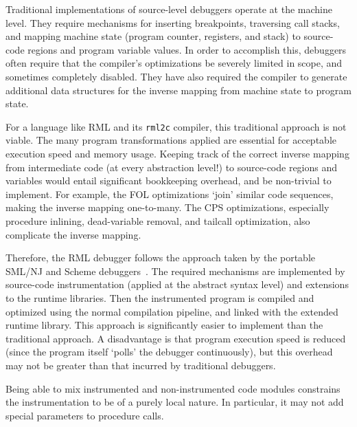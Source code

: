 \documentclass[12pt,a4paper]{article}
\begin{document}
Traditional implementations of source-level debuggers operate
at the machine level. They require mechanisms for inserting
breakpoints, traversing call stacks, and mapping machine state
(program counter, registers, and stack) to source-code regions
and program variable values.
In order to accomplish this, debuggers often require that
the compiler's optimizations be severely limited in scope,
and sometimes completely disabled.
They have also required the compiler to generate additional
data structures for the inverse mapping from machine state to program state.

For a language like RML and its \texttt{rml2c} compiler, this
traditional approach is not viable.
The many program transformations applied are essential for
acceptable execution speed and memory usage.
Keeping track of the correct inverse mapping from intermediate
code (at every abstraction level!) to source-code regions and variables
would entail significant bookkeeping overhead, and be non-trivial
to implement.
For example, the FOL optimizations `join' similar code sequences,
making the inverse mapping one-to-many.
The CPS optimizations, especially procedure inlining, dead-variable
removal, and tailcall optimization, also complicate the inverse mapping.

Therefore, the RML debugger follows the approach taken by the portable
SML/NJ and Scheme debuggers~\cite{TolmachA95,Tolmach92,Kellomaki93}.
The required mechanisms are implemented by source-code instrumentation
(applied at the abstract syntax level) and extensions to the
runtime libraries. Then the instrumented program is compiled
and optimized using the normal compilation pipeline, and linked
with the extended runtime library.
This approach is significantly easier to implement than the
traditional approach. A disadvantage is that program execution speed
is reduced (since the program itself `polls' the debugger continuously),
but this overhead may not be greater than that incurred by
traditional debuggers.

Being able to mix instrumented and non-instrumented code modules
constrains the instrumentation to be of a purely local nature.
In particular, it may not add special parameters to procedure calls.
%
\end{document}
